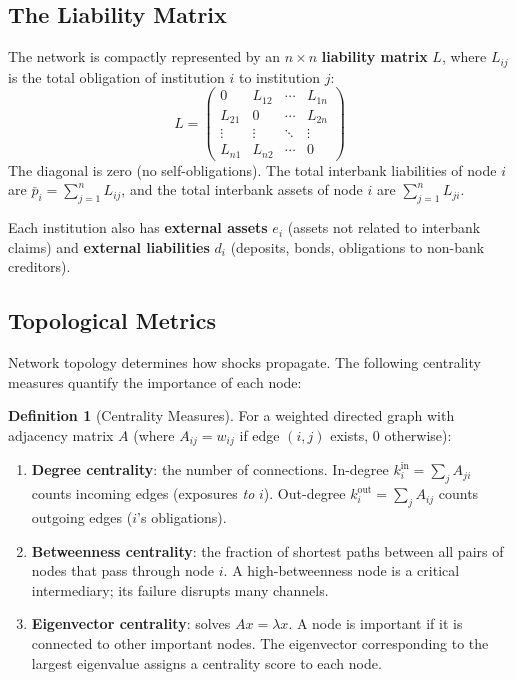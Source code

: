 \documentclass[11pt, a4paper]{article}
\theoremstyle{definition}
\newtheorem{definition}{Definition}[section]
\theoremstyle{plain}
\theoremstyle{remark}
\begin{document}
\subsection{The Liability Matrix}

The network is compactly represented by an $n \times n$ \textbf{liability matrix}
$L$, where $L_{ij}$ is the total obligation of institution $i$ to institution $j$:
\begin{equation}\label{eq:liability-matrix}
    L = \begin{pmatrix}
        0      & L_{12} & \cdots & L_{1n} \\
        L_{21} & 0      & \cdots & L_{2n} \\
        \vdots & \vdots & \ddots & \vdots \\
        L_{n1} & L_{n2} & \cdots & 0
    \end{pmatrix}
\end{equation}
The diagonal is zero (no self-obligations).
The total interbank liabilities of node $i$ are $\bar{p}_i = \sum_{j=1}^{n} L_{ij}$,
and the total interbank assets of node $i$ are $\sum_{j=1}^{n} L_{ji}$.

Each institution also has \textbf{external assets} $e_i$ (assets not related to
interbank claims) and \textbf{external liabilities} $d_i$ (deposits, bonds,
obligations to non-bank creditors).

\subsection{Topological Metrics}

Network topology determines how shocks propagate.
The following centrality measures quantify the importance of each node:

\begin{definition}[Centrality Measures]\label{def:centrality}
For a weighted directed graph with adjacency matrix $A$ (where $A_{ij} = w_{ij}$
if edge $(i,j)$ exists, 0 otherwise):
\begin{enumerate}
    \item \textbf{Degree centrality}: the number of connections.
          In-degree $k_i^{\text{in}} = \sum_j A_{ji}$ counts incoming edges
          (exposures \emph{to} $i$).
          Out-degree $k_i^{\text{out}} = \sum_j A_{ij}$ counts outgoing edges
          ($i$'s obligations).
    \item \textbf{Betweenness centrality}: the fraction of shortest paths between
          all pairs of nodes that pass through node $i$.
          A high-betweenness node is a critical intermediary; its failure disrupts
          many channels.
    \item \textbf{Eigenvector centrality}: solves $Ax = \lambda x$.
          A node is important if it is connected to other important nodes.
          The eigenvector corresponding to the largest eigenvalue assigns a centrality
          score to each node.
\end{enumerate}
\end{definition}
\end{document}

